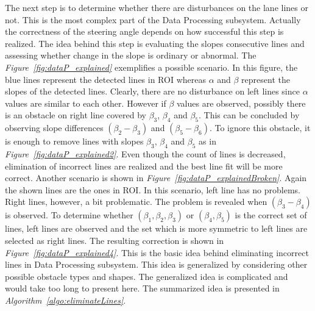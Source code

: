 \documentclass[a4paper,12pt]{article}
\begin{document}
\begin{enumerate}[A.]
The next step is to determine whether there are disturbances on the lane lines or not. This is the most complex part of the Data Processing subsystem. Actually the correctness of the steering angle depends on how successful this step is realized. The idea behind this step is evaluating the slopes consecutive lines and assessing whether change in the slope is ordinary or abnormal. The \textit{Figure~\ref{fig:dataP_explained}} exemplifies a possible scenario. In this figure, the blue lines represent the detected lines in ROI whereas $\alpha$ and $\beta$ represent the slopes of the detected lines. Clearly, there are no disturbance on left lines since $\alpha$ values are similar to each other. However if $\beta$ values are observed, possibly there is an obstacle on right line covered by $\beta_3$, $\beta_4$ and $\beta_5$. This can be concluded by observing slope differences $(\beta_2 - \beta_3)$ and $(\beta_5 - \beta_6)$. To ignore this obstacle, it is enough to remove lines with slopes $\beta_3$, $\beta_4$ and $\beta_5$ as in \textit{Figure~\ref{fig:dataP_explained2}}. Even though the count of lines is decreased, elimination of incorrect lines are realized and the best line fit will be more correct. Another scenario is shown in \textit{Figure~\ref{fig:dataP_explainedBroken}}. Again the shown lines are the ones in ROI. In this scenario, left line has no problems. Right lines, however, a bit problematic. The problem is revealed when  $(\beta_3 - \beta_4)$ is observed. To determine whether  $(\beta_1, \beta_2, \beta_3)$ or $(\beta_4, \beta_5)$ is the correct set of lines, left lines are observed and the set which is more symmetric to left lines are selected as right lines. The resulting correction is shown in \textit{Figure~\ref{fig:dataP_explained4}}.	This is the basic idea behind eliminating incorrect lines in Data Processing subsystem. This idea is generalized by considering other possible obstacle types and shapes. The generalized idea is complicated and would take too long to present here. The summarized idea is presented in \textit{Algorithm~\ref{algo:eliminateLines}}.

\begin{figure}[t!]

\setlength{\unitlength}{\textwidth} 

\centering

\begin{subfigure}{.46\textwidth}

\centering


\end{subfigure}
\end{figure}
\end{enumerate}
\end{document}
